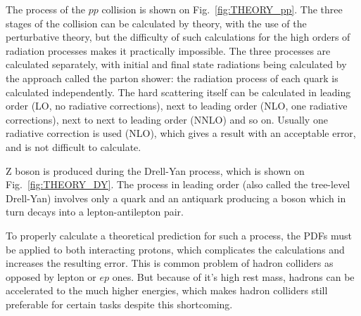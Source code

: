 The process of the $pp$ collision is shown on Fig.~\ref{fig:THEORY_pp}. The three stages of the collision can be calculated by theory, with the use of the perturbative theory, but the difficulty of such calculations for the high orders of radiation processes makes it practically impossible. The three processes are calculated separately, with initial and final state radiations being calculated by the approach called the parton shower: the radiation process of each quark is calculated independently. The hard scattering itself can be calculated in leading order (LO, no radiative corrections), next to leading order (NLO, one radiative corrections), next to next to leading order (NNLO) and so on. Usually one radiative correction is used (NLO), which gives a result with an acceptable error, and is not difficult to calculate.

\begin{figure}
\end{figure}

Z boson is produced during the Drell-Yan process, which is shown on Fig.~\ref{fig:THEORY_DY}. The process in leading order (also called the tree-level Drell-Yan) involves only a quark and an antiquark producing a boson which in turn decays into a lepton-antilepton pair.

To properly calculate a theoretical prediction for such a process, the PDFs must be applied to both interacting protons, which complicates the calculations and increases the resulting error. This is common problem of hadron colliders as opposed by lepton or $ep$ ones. But because of it's high rest mass, hadrons can be accelerated to the much higher energies, which makes hadron colliders still preferable for certain tasks despite this shortcoming.

